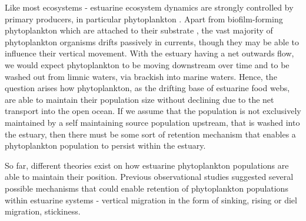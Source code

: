 \documentclass[npg, manuscript]{copernicus}
\begin{document}
Like most ecosystems - estuarine ecosystem dynamics are strongly controlled by primary producers, in particular phytoplankton \citep{Chen2023}.
Apart from biofilm-forming phytoplankton which are attached to their substrate \citep{Cheah2022},
the vast majority of phytoplankton organisms drifts passively in currents, though they may be able to influence their vertical movement.
With the estuary having a net outwards flow, we would expect phytoplankton to be moving downstream over time and to be washed out from limnic waters, via brackish into marine waters.
Hence, the question arises how phytoplankton, as the drifting base of estuarine food webs, are able to maintain their population size without declining due to the net transport into the open ocean.
If we assume that the population is not exclusively maintained by  a self maintaining source population upstream, that is washed into the estuary, then there must be some sort of retention mechanism that enables a phytoplankton population to persist within the estuary.




So far, different theories exist on how estuarine phytoplankton populations are able to maintain their position. Previous observational studies suggested several possible mechanisms that could enable retention of phytoplankton populations within estuarine systems - vertical migration in the form of sinking,  rising or diel migration, stickiness.
\end{document}
